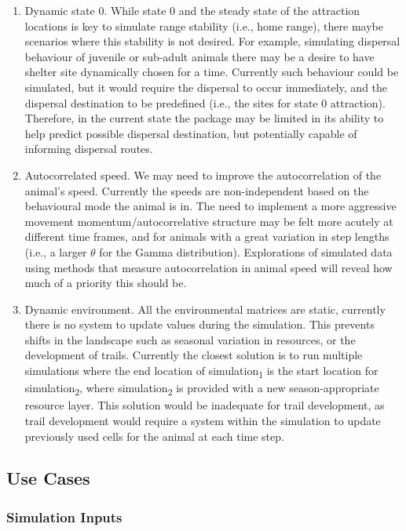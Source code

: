 \documentclass[10pt,a4paper]{article}
\begin{document}
\begin{enumerate}
\def\labelenumi{\arabic{enumi}.}
\item
  Dynamic state 0. While state 0 and the steady state of the attraction locations is key to simulate range stability (i.e., home range), there maybe scenarios where this stability is not desired.
  For example, simulating dispersal behaviour of juvenile or sub-adult animals there may be a desire to have shelter site dynamically chosen for a time.
  Currently such behaviour could be simulated, but it would require the dispersal to occur immediately, and the dispersal destination to be predefined (i.e., the sites for state 0 attraction).
  Therefore, in the current state the package may be limited in its ability to help predict possible dispersal destination, but potentially capable of informing dispersal routes.
\item
  Autocorrelated speed. We may need to improve the autocorrelation of the animal's speed.
  Currently the speeds are non-independent based on the behavioural mode the animal is in.
  The need to implement a more aggressive movement momentum/autocorrelative structure may be felt more acutely at different time frames, and for animals with a great variation in step lengths (i.e., a larger \(\theta\) for the Gamma distribution).
  Explorations of simulated data using methods that measure autocorrelation in animal speed will reveal how much of a priority this should be.
\item
  Dynamic environment. All the environmental matrices are static, currently there is no system to update values during the simulation.
  This prevents shifts in the landscape such as seasonal variation in resources, or the development of trails.
  Currently the closest solution is to run multiple simulations where the end location of simulation\textsubscript{1} is the start location for simulation\textsubscript{2}, where simulation\textsubscript{2} is provided with a new season-appropriate resource layer.
  This solution would be inadequate for trail development, as trail development would require a system within the simulation to update previously used cells for the animal at each time step.
\end{enumerate}

\hypertarget{use-cases}{%
\subsection{Use Cases}\label{use-cases}}

\hypertarget{simulation-inputs}{%
\subsubsection{Simulation Inputs}\label{simulation-inputs}}
\end{document}
